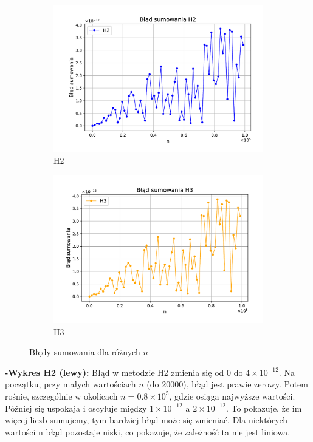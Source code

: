 \documentclass[a4paper,12pt]{article}
\begin{document}
\begin{figure}[h]
    \centering
    \begin{subfigure}[b]{0.45\textwidth}
        \includegraphics[width=\textwidth]{blad_sumowania_h2.pdf}
        \caption{H2}
    \end{subfigure}
    \hfill
    \begin{subfigure}[b]{0.45\textwidth}
        \includegraphics[width=\textwidth]{blad_sumowania_h3.pdf}
        \caption{H3}
    \end{subfigure}
    \caption{Błędy sumowania dla różnych \( n \)}
    \label{fig:errors}
\end{figure}

\textbf{-Wykres H2 (lewy):}
 Błąd w metodzie H2 zmienia się od 0 do \( 4 \times 10^{-12} \). Na początku, przy małych wartościach \( n \) (do 20000), błąd jest prawie zerowy. Potem rośnie, szczególnie w okolicach \( n = 0.8 \times 10^5 \), gdzie osiąga najwyższe wartości. Później się uspokaja i oscyluje między \( 1 \times 10^{-12} \) a \( 2 \times 10^{-12} \). To pokazuje, że im więcej liczb sumujemy, tym bardziej błąd może się zmieniać. Dla niektórych wartości n błąd pozostaje niski, co pokazuje, że zależność ta nie jest liniowa.
\end{document}
